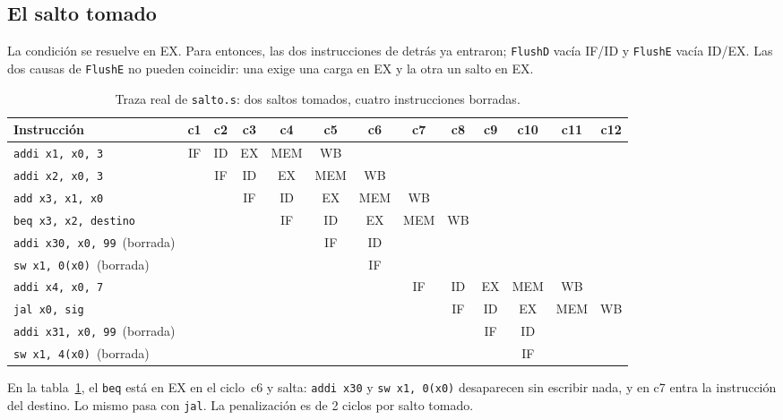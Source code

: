 \documentclass[11pt,letterpaper]{article}
\newcommand{\cod}[1]{\texttt{#1}}
\begin{document}
\subsection{El salto tomado}
La condici\'on se resuelve en EX. Para entonces, las dos instrucciones de detr\'as ya entraron;
\cod{FlushD} vac\'ia IF/ID y \cod{FlushE} vac\'ia ID/EX. Las dos causas de \cod{FlushE} no pueden
coincidir: una exige una carga en EX y la otra un salto en EX.

\begin{table}[!htbp]
\centering\scriptsize
\setlength{\tabcolsep}{2.2pt}
\begin{tabular}{@{}lcccccccccccc@{}}
\toprule
\textbf{Instrucci\'on} & \textbf{c1} & \textbf{c2} & \textbf{c3} & \textbf{c4} & \textbf{c5} & \textbf{c6} & \textbf{c7} & \textbf{c8} & \textbf{c9} & \textbf{c10} & \textbf{c11} & \textbf{c12} \\
\midrule
\texttt{addi x1, x0, 3} & IF & ID & EX & MEM & WB &  &  &  &  &  &  &  \\
\texttt{addi x2, x0, 3} &  & IF & ID & EX & MEM & WB &  &  &  &  &  &  \\
\texttt{add x3, x1, x0} &  &  & IF & ID & EX & MEM & WB &  &  &  &  &  \\
\texttt{beq x3, x2, destino} &  &  &  & IF & ID & EX & MEM & WB &  &  &  &  \\
\textcolor{control}{\texttt{addi x30, x0, 99}\ (borrada)} &  &  &  &  & IF & ID &  &  &  &  &  &  \\
\textcolor{control}{\texttt{sw x1, 0(x0)}\ (borrada)} &  &  &  &  &  & IF &  &  &  &  &  &  \\
\texttt{addi x4, x0, 7} &  &  &  &  &  &  & IF & ID & EX & MEM & WB &  \\
\texttt{jal x0, sig} &  &  &  &  &  &  &  & IF & ID & EX & MEM & WB \\
\textcolor{control}{\texttt{addi x31, x0, 99}\ (borrada)} &  &  &  &  &  &  &  &  & IF & ID &  &  \\
\textcolor{control}{\texttt{sw x1, 4(x0)}\ (borrada)} &  &  &  &  &  &  &  &  &  & IF &  &  \\
\bottomrule
\end{tabular}
\caption{Traza real de \cod{salto.s}: dos saltos tomados, cuatro instrucciones borradas.}
\label{tab:traza_salto}
\end{table}

En la tabla~\ref{tab:traza_salto}, el \cod{beq} est\'a en EX en el ciclo~c6 y salta: \cod{addi x30} y
\cod{sw x1, 0(x0)} desaparecen sin escribir nada, y en c7 entra la instrucci\'on del destino. Lo mismo
pasa con \cod{jal}. La penalizaci\'on es de 2 ciclos por salto tomado.
\end{document}
